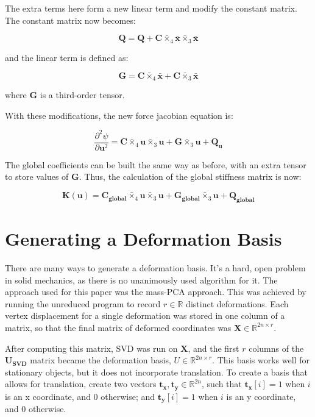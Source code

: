 \documentclass[twocolumn,10pt]{asme2ej}
\begin{document}
The extra terms here form a new linear term and modify the constant matrix. The constant matrix now becomes:

\begin{equation}
 \bm{Q} = \bm{Q} + \bm{C} \bar{\times}_4 \bm{\bar{x}} \bar{\times}_3 \bm{\bar{x}}
\end{equation}

and the linear term is defined as:

\begin{equation}
 \bm{G} = \bm{C} \bar{\times}_4 \bm{\bar{x}} + \bm{C} \bar{\times}_3 \bm{\bar{x}}
\end{equation}

where $\bm{G}$ is a third-order tensor.

With these modifications, the new force jacobian equation is:

\begin{equation}
\frac{\partial^2 \psi}{\partial \bm{u}^2} = \bm{C} \bar{\times}_4 \bm{u} \bar{\times}_3 \bm{u}
+ \bm{G} \bar{\times}_3 \bm{u} + \bm{Q_u}
\end{equation}

The global coefficients can be built the same way as before, with an extra tensor to store values of $\bm{G}$. Thus, the calculation of the global stiffness matrix is now:

\begin{equation}
  \bm{K}(\bm{u}) = \bm{C_{global}} \bar{\times}_4 \bm{u} \bar{\times}_3 \bm{u}
  + \bm{G_{global}} \bar{\times}_3 \bm{u} + \bm{Q_{global}}
  \label{eq_globalStiffness}
\end{equation}

\section{Generating a Deformation Basis}

There are many ways to generate a deformation basis. It's a hard, open problem in solid mechanics, as there is no unanimously used algorithm for it. The approach used for this paper was the mass-PCA approach. This was achieved by running the unreduced program to record $r \in \mathbb{R}$ distinct deformations. Each vertex displacement for a single deformation was stored in one column of a matrix, so that the final matrix of deformed coordinates was $\bm{X} \in \mathbb{R}^{2n \times r}$.

After computing this matrix, SVD was run on $\bm{X}$, and the first $r$ columns of the $\bm{U_{SVD}}$ matrix became the deformation basis, $U \in \mathbb{R}^{2n \times r}$. This basis works well for stationary objects, but it does not incorporate translation. To create a basis that allows for translation, create two vectors $\bm{t_x}, \bm{t_y} \in \mathbb{R}^{2n}$, such that
$\bm{t_x}[i] = 1$ when $i$ is an x coordinate, and $0$ otherwise;
and $\bm{t_y}[i] = 1$ when $i$ is an y coordinate, and $0$ otherwise.
\end{document}

